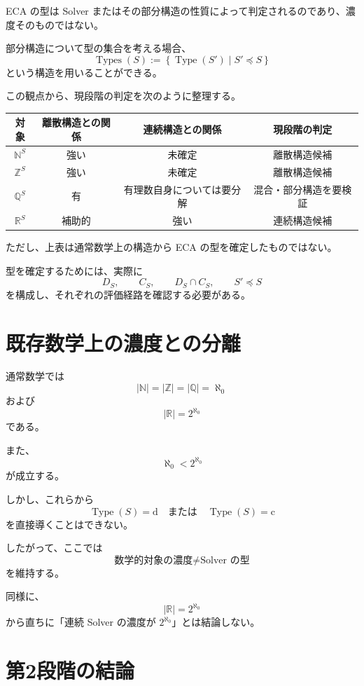 \documentclass[a4paper,11pt]{article}
\newcommand{\N}{\mathbb{N}}
\newcommand{\Z}{\mathbb{Z}}
\newcommand{\Q}{\mathbb{Q}}
\newcommand{\R}{\mathbb{R}}
\newcommand{\Type}{\operatorname{Type}}
\newcommand{\Types}{\operatorname{Types}}
\begin{document}
ECA の型は Solver またはその部分構造の性質によって判定されるのであり、濃度そのものではない。

部分構造について型の集合を考える場合、
\[
\Types(S)
:=
\left\{
\Type(S')\mid S'\preceq S
\right\}
\]
という構造を用いることができる。

この観点から、現段階の判定を次のように整理する。

\begin{center}
\begin{tabular}{|c|c|c|c|}
\hline
対象 & 離散構造との関係 & 連続構造との関係 & 現段階の判定 \\
\hline
$\N^S$ & 強い & 未確定 & 離散構造候補 \\
\hline
$\Z^S$ & 強い & 未確定 & 離散構造候補 \\
\hline
$\Q^S$ & 有 & 有理数自身については要分解 & 混合・部分構造を要検証 \\
\hline
$\R^S$ & 補助的 & 強い & 連続構造候補 \\
\hline
\end{tabular}
\end{center}

ただし、上表は通常数学上の構造から ECA の型を確定したものではない。

型を確定するためには、実際に
\[
D_S,
\qquad
C_S,
\qquad
D_S\cap C_S,
\qquad
S'\preceq S
\]
を構成し、それぞれの評価経路を確認する必要がある。

\section{既存数学上の濃度との分離}

通常数学では
\[
|\N|=|\Z|=|\Q|=\aleph_0
\]
および
\[
|\R|=2^{\aleph_0}
\]
である。

また、
\[
\aleph_0<2^{\aleph_0}
\]
が成立する。

しかし、これらから
\[
\Type(S)=\mathrm{d}
\quad\text{または}\quad
\Type(S)=\mathrm{c}
\]
を直接導くことはできない。

したがって、ここでは
\[
\boxed{
\text{数学的対象の濃度}
\neq
\text{Solver の型}
}
\]
を維持する。

同様に、
\[
|\R|=2^{\aleph_0}
\]
から直ちに「連続 Solver の濃度が $2^{\aleph_0}$」とは結論しない。

\section{第2段階の結論}
\end{document}
